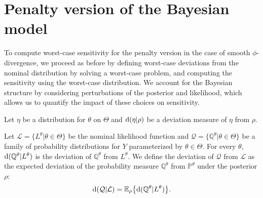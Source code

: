 \documentclass[11pt,reqno,letter]{amsart}
\theoremstyle{plain}
\theoremstyle{definition}
\numberwithin{equation}{section}
\numberwithin{theorem}{section}
\numberwithin{table}{section}
\numberwithin{figure}{section}
\begin{document}
\section{Penalty version of the Bayesian model}
\label{App:BayesPenalty}
To compute worst-case sensitivity for the penalty version in the case of smooth $\phi$-divergence, we proceed as before by defining worst-case deviations from the nominal distribution by solving a worst-case problem, and computing the sensitivity using the worst-case distribution. We account for the Bayesian structure by considering perturbations of the posterior and likelihood, which allows us to quantify the impact of these choices on sensitivity. 

Let $\eta$ be a distribution for $\theta$ on $\Theta$  and ${\rm d}( \eta | \rho)$ be a deviation measure of $\eta$ from $\rho$. 


Let ${\mathcal L} = \{ L^\theta| \theta\in\Theta\}$ be the nominal likelihood function and ${\mathcal Q} = \{{\mathbb Q}^\theta\vert\theta\in\Theta\}$ be a family of probability distributions for $Y$ parameterized by $\theta\in\Theta$. For every $\theta$, ${\rm d}({\mathbb Q}^\theta| L^\theta)$ is the deviation of ${\mathbb Q}^\theta$ from $L^\theta$. 
We define the deviation of ${\mathcal Q}$ from $\mathcal L$ as the expected deviation of the probability measure ${\mathbb Q}^\theta$ from ${\mathbb P}^\theta$ under the posterior $\rho$:
\begin{eqnarray}
{\rm d}({\mathcal Q}| {\mathcal L}) =  {\mathbb E}_\mathbb \rho \big\{{\rm d}({\mathbb Q}^\theta| L^\theta)\big\}.
\label{eq:dQL}
\end{eqnarray}
\end{document}
